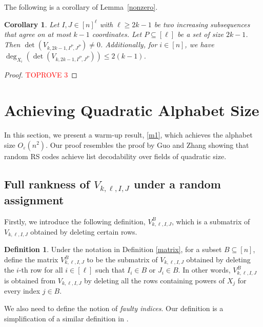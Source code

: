 \documentclass[11pt]{article}
\theoremstyle{plain}
\newtheorem{cor}[thm]{Corollary}
\theoremstyle{definition}
\newtheorem{defn}[thm]{Definition}
\theoremstyle{remark}
\newcommand{\eps}{\varepsilon}
\begin{document}
The following is a corollary of Lemma~\ref{nonzero}.
\begin{cor}
\label{roub}
    Let $I, J \in[n]^{\ell}$ with $\ell\ge 2k-1$ be two increasing subsequences that agree on at most $k-1$ coordinates. Let $P\subseteq [\ell]$ be a set of size $2k-1$. Then $\det (V_{k,2k-1,I^P,J^P})\neq 0$. 
    Additionally, for $i\in[n]$, we have $\deg_{X_i}(\det (V_{k,2k-1,I^P,J^P}))\leq 2(k-1)$. 
\end{cor}
\begin{proof}\textcolor{red}{TOPROVE 3}\end{proof}
\section{Achieving Quadratic Alphabet Size}
In this section, we present a warm-up result, \cref{m1}, which achieves the alphabet size $O_{\eps}(n^2)$. Our proof resembles the proof by Guo and Zhang \cite{GZ23} showing that random RS codes achieve list decodability over fields of quadratic size. 


\subsection{Full rankness of $V_{k,\ell,I,J}$ under a random assignment}
Firstly, we introduce the following definition, $V_{k,\ell,I,J}^{B}$, which is a submatrix of $V_{k,\ell,I,J}$ obtained by deleting certain rows. 
\begin{defn}\label{delete_B}
Under the notation in Definition \ref{matrix}, for a subset $B\subseteq [n]$, define the matrix $V_{k,\ell,I,J}^{B}$ to be the submatrix of $V_{k,\ell,I,J}$ obtained by deleting the $i$-th row for all $i\in [\ell]$ such that $I_i\in B$ or $J_i\in B$. 
In other words, $V_{k,\ell,I,J}^{B}$ is obtained from $V_{k,\ell,I,J}$ by deleting all the rows containing powers of $X_j$ for every index $j\in B$.
\end{defn}

We also need to define the notion of \emph{faulty indices}. Our definition is a simplification of a similar definition in \cite{GZ23}. 
\end{document}
